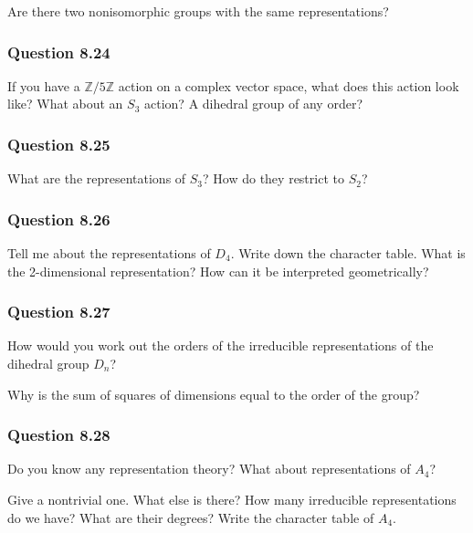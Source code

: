 Are there two nonisomorphic groups with the same representations?

\hypertarget{question-8.24}{%
\subsubsection{Question 8.24}\label{question-8.24}}

If you have a \({\mathbb{Z}}/5{\mathbb{Z}}\) action on a complex vector
space, what does this action look like? What about an \(S_3\) action? A
dihedral group of any order?

\hypertarget{question-8.25}{%
\subsubsection{Question 8.25}\label{question-8.25}}

What are the representations of \(S_3\)? How do they restrict to
\(S_2\)?

\hypertarget{question-8.26}{%
\subsubsection{Question 8.26}\label{question-8.26}}

Tell me about the representations of \(D_4\). Write down the character
table. What is the 2-dimensional representation? How can it be
interpreted geometrically?

\hypertarget{question-8.27}{%
\subsubsection{Question 8.27}\label{question-8.27}}

How would you work out the orders of the irreducible representations of
the dihedral group \(D_n\)?

Why is the sum of squares of dimensions equal to the order of the group?

\hypertarget{question-8.28}{%
\subsubsection{Question 8.28}\label{question-8.28}}

Do you know any representation theory? What about representations of
\(A_4\)?

Give a nontrivial one. What else is there? How many irreducible
representations do we have? What are their degrees? Write the character
table of \(A_4\).


